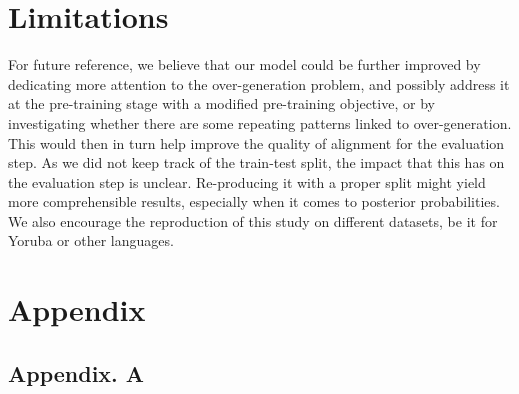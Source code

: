 \documentclass[11pt]{article}
\begin{document}
{\section*{Limitations}

For future reference, we believe that our model could be further improved by dedicating more attention to the over-generation problem, and possibly address it at the pre-training stage with a modified pre-training objective, or by investigating whether there are some repeating patterns linked to over-generation. This would then in turn help improve the quality of alignment for the evaluation step.
As we did not keep track of the train-test split, the impact that this has on the evaluation step is unclear. Re-producing it with a proper split might yield more comprehensible results, especially when it comes to posterior probabilities.
We also encourage the reproduction of this study on different datasets, be it for Yoruba or other languages.






\appendix
\section{Appendix}
\label{sec:appendix}
\subsection{Appendix. A}

}
\end{document}
